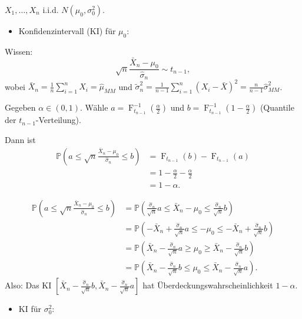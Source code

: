 \documentclass{tstextbook}
\DeclareMathOperator{\F}{F} %
\newcommand{\Prob}{\mathbb P}
\begin{document}
\begin{example}[Normalverteilung]
	$ X_1, \ldots, X_n $ i.i.d. $ N(\mu_0, \sigma_0^2) $. 
	
	
	\begin{itemize} \item Konfidenzintervall (KI) für $ \mu_0 $: \end{itemize}
	
	
	Wissen: \[\sqrt{n}\frac{\bar{X}_n-\mu_0}{\hat{\sigma}_n} \sim t_{n-1},\] 
	wobei $ \bar{X}_n = \frac{1}{n}\sum_{i=1}^{n} X_i = \hat{\mu}_{MM} $ und $ \tilde{\sigma}_n^2 = \frac{1}{n-1} \sum_{i=1}^{n} (X_i-\bar{X})^2 = \frac{n}{n-1}\hat{\sigma}_{MM}^2 $.
	
	Gegeben $ \alpha \in (0,1) $. Wähle $ a = \F_{t_{n-1}}^{-1} \left(\frac{\alpha}{2}\right) $ und $ b = \F_{t_{n-1}}^{-1} \left(1-\frac{\alpha}{2}\right) $ (Quantile der $ t_{n-1} $-Verteilung).
	
	Dann ist 
	\[
	\begin{aligned}
		\Prob\left(a\le\sqrt{n}\frac{\bar{X}_n-\mu_0}{\hat{\sigma}_n} \le b \right) & = \F_{t_{n-1}}(b) - \F_{t_{n-1}}(a) \\
		& = 1 - \frac{\alpha}{2} - \frac{\alpha}{2} \\
		& = 1 - \alpha.
	\end{aligned}
	\]
	
	\[
	\begin{aligned}
		\Prob\left(a\le\sqrt{n}\frac{\bar{X}_n-\mu_0}{\hat{\sigma}_n} \le b \right) & = \Prob\left(\frac{\hat{\sigma}_n}{\sqrt{n}}a \le \bar{X}_n - \mu_0 \le \frac{\hat{\sigma}_n}{\sqrt{n}}b \right) \\
		& = \Prob\left(- \bar{X}_n + \frac{\hat{\sigma}_n}{\sqrt{n}}a \le - \mu_0 \le - \bar{X}_n + \frac{\hat{\sigma}_n}{\sqrt{n}}b \right) \\
		& = \Prob\left(\bar{X}_n - \frac{\hat{\sigma}_n}{\sqrt{n}}a \ge \mu_0 \ge \bar{X}_n - \frac{\hat{\sigma}_n}{\sqrt{n}}b \right) \\
		& = \Prob\left(\bar{X}_n - \frac{\hat{\sigma}_n}{\sqrt{n}}b \le \mu_0 \le \bar{X}_n - \frac{\hat{\sigma}_n}{\sqrt{n}}a \right).
	\end{aligned}
	\]
	Also: Das KI $ \left[\bar{X}_n-\frac{\hat{\sigma}_n}{\sqrt{n}}b, \bar{X}_n-\frac{\hat{\sigma}_n}{\sqrt{n}}a \right] $ hat Überdeckungswahrscheinlichkeit $ 1-\alpha $.
	
	
	\begin{itemize} \item KI für $ \sigma_0^2 $: \end{itemize}
	

\end{example}
\end{document}
